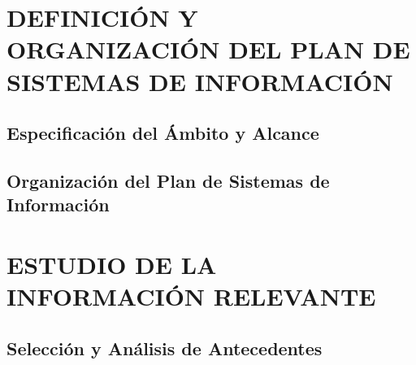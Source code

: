\newpage
\section{DEFINICIÓN Y ORGANIZACIÓN DEL PLAN DE SISTEMAS DE INFORMACIÓN}
 

\subsection{Especificación del Ámbito y Alcance} 


\subsection{Organización del Plan de Sistemas de Información }



\newpage
\section{ESTUDIO DE LA INFORMACIÓN RELEVANTE}
 
\subsection{Selección y Análisis de Antecedentes} 
